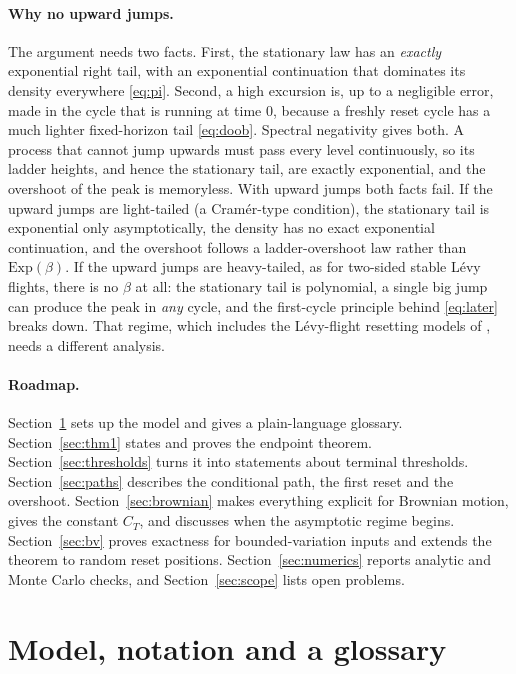 \documentclass[11pt,a4paper]{article}
\begin{document}
\paragraph{Why no upward jumps.}
The argument needs two facts. First, the stationary law has an \emph{exactly} exponential right tail, with an exponential continuation that dominates its density everywhere \eqref{eq:pi}. Second, a high excursion is, up to a negligible error, made in the cycle that is running at time $0$, because a freshly reset cycle has a much lighter fixed-horizon tail \eqref{eq:doob}. Spectral negativity gives both. A process that cannot jump upwards must pass every level continuously, so its ladder heights, and hence the stationary tail, are exactly exponential, and the overshoot of the peak is memoryless. With upward jumps both facts fail. If the upward jumps are light-tailed (a Cram\'er-type condition), the stationary tail is exponential only asymptotically, the density has no exact exponential continuation, and the overshoot follows a ladder-overshoot law rather than $\mathrm{Exp}(\beta)$. If the upward jumps are heavy-tailed, as for two-sided stable L\'evy flights, there is no $\beta$ at all: the stationary tail is polynomial, a single big jump can produce the peak in \emph{any} cycle, and the first-cycle principle behind \eqref{eq:later} breaks down. That regime, which includes the L\'evy-flight resetting models of \cite{KMSS2014,MMSS2022,ZP2026}, needs a different analysis.

\paragraph{Roadmap.}
Section~\ref{sec:model} sets up the model and gives a plain-language glossary. Section~\ref{sec:thm1} states and proves the endpoint theorem. Section~\ref{sec:thresholds} turns it into statements about terminal thresholds. Section~\ref{sec:paths} describes the conditional path, the first reset and the overshoot. Section~\ref{sec:brownian} makes everything explicit for Brownian motion, gives the constant $C_T$, and discusses when the asymptotic regime begins. Section~\ref{sec:bv} proves exactness for bounded-variation inputs and extends the theorem to random reset positions. Section~\ref{sec:numerics} reports analytic and Monte Carlo checks, and Section~\ref{sec:scope} lists open problems.

\section{Model, notation and a glossary}\label{sec:model}
\end{document}
